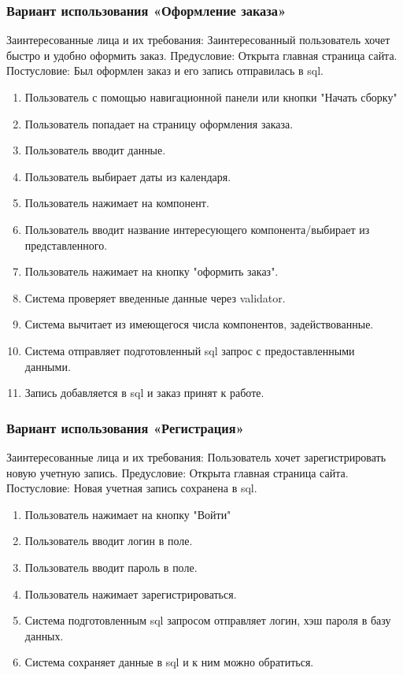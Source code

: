 \subsubsection{Вариант использования «Оформление заказа»}
Заинтересованные лица и их требования: Заинтересованный пользователь хочет быстро и удобно оформить заказ.
Предусловие: Открыта главная страница сайта.
Постусловие: Был оформлен заказ и его запись отправилась в sql.
\begin{enumerate}
	\item Пользователь с помощью навигационной панели или кнопки "Начать сборку" 
	\item Пользователь попадает на страницу оформления заказа.
	\item Пользователь вводит данные.
	\item Пользователь выбирает даты из календаря.
	\item Пользователь нажимает на компонент.
	\item Пользователь вводит название интересующего компонента/выбирает из представленного.
	\item Пользователь нажимает на кнопку "оформить заказ".
	\item Система проверяет введенные данные через validator.
	\item Система вычитает из имеющегося числа компонентов, задействованные.
	\item Система отправляет подготовленный sql запрос с предоставленными данными.
	\item Запись добавляется в sql и заказ принят к работе.
\end{enumerate}

\subsubsection{Вариант использования «Регистрация»}
Заинтересованные лица и их требования: Пользователь хочет зарегистрировать новую учетную запись.
Предусловие: Открыта главная страница сайта.
Постусловие: Новая учетная запись сохранена в sql.
\begin{enumerate}
	\item Пользователь нажимает на кнопку "Войти" 
	\item Пользователь вводит логин в поле.
	\item Пользователь вводит пароль в поле.
	\item Пользователь нажимает зарегистрироваться.
	\item Система подготовленным sql запросом отправляет логин, хэш пароля в базу данных.
	\item Система сохраняет данные в sql и к ним можно обратиться.
\end{enumerate}

